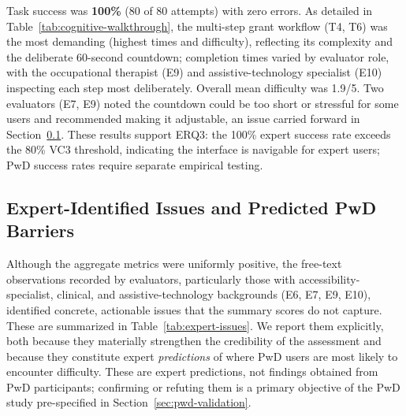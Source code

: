 \documentclass[journal,onecolumn]{IEEEtran}
\begin{document}
Task success was \textbf{100\%} (80 of 80 attempts) with zero errors. As detailed in Table~\ref{tab:cognitive-walkthrough}, the multi-step grant workflow (T4, T6) was the most demanding (highest times and difficulty), reflecting its complexity and the deliberate 60-second countdown; completion times varied by evaluator role, with the occupational therapist (E9) and assistive-technology specialist (E10) inspecting each step most deliberately. Overall mean difficulty was 1.9/5. Two evaluators (E7, E9) noted the countdown could be too short or stressful for some users and recommended making it adjustable, an issue carried forward in Section~\ref{subsec:expert-issues}. These results support ERQ3: the 100\% expert success rate exceeds the 80\% VC3 threshold, indicating the interface is navigable for expert users; PwD success rates require separate empirical testing.

\subsection{Expert-Identified Issues and Predicted PwD Barriers}
\label{subsec:expert-issues}

Although the aggregate metrics were uniformly positive, the free-text observations recorded by evaluators, particularly those with accessibility-specialist, clinical, and assistive-technology backgrounds (E6, E7, E9, E10), identified concrete, actionable issues that the summary scores do not capture. These are summarized in Table~\ref{tab:expert-issues}. We report them explicitly, both because they materially strengthen the credibility of the assessment and because they constitute expert \emph{predictions} of where PwD users are most likely to encounter difficulty. These are expert predictions, not findings obtained from PwD participants; confirming or refuting them is a primary objective of the PwD study pre-specified in Section~\ref{sec:pwd-validation}.
\end{document}
